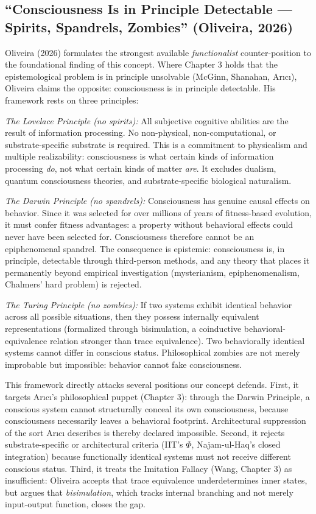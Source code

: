 \documentclass[acmlarge, nonacm]{acmart}
\begin{document}
\subsection{``Consciousness Is in Principle Detectable --- Spirits, Spandrels, Zombies'' (Oliveira, 2026)}

Oliveira (2026) \cite{oliveira2026} formulates the strongest available \textit{functionalist} counter-position to the foundational finding of this concept. Where Chapter 3 holds that the epistemological problem is in principle unsolvable (McGinn, Shanahan, Ar{\i}c{\i}), Oliveira claims the opposite: consciousness is in principle detectable. His framework rests on three principles:

\textit{The Lovelace Principle (no spirits):} All subjective cognitive abilities are the result of information processing. No non-physical, non-computational, or substrate-specific substrate is required. This is a commitment to physicalism and multiple realizability: consciousness is what certain kinds of information processing \textit{do}, not what certain kinds of matter \textit{are}. It excludes dualism, quantum consciousness theories, and substrate-specific biological naturalism.

\textit{The Darwin Principle (no spandrels):} Consciousness has genuine causal effects on behavior. Since it was selected for over millions of years of fitness-based evolution, it must confer fitness advantages: a property without behavioral effects could never have been selected for. Consciousness therefore cannot be an epiphenomenal spandrel. The consequence is epistemic: consciousness is, in principle, detectable through third-person methods, and any theory that places it permanently beyond empirical investigation (mysterianism, epiphenomenalism, Chalmers' hard problem) is rejected.

\textit{The Turing Principle (no zombies):} If two systems exhibit identical behavior across all possible situations, then they possess internally equivalent representations (formalized through bisimulation, a coinductive behavioral-equivalence relation stronger than trace equivalence). Two behaviorally identical systems cannot differ in conscious status. Philosophical zombies are not merely improbable but impossible: behavior cannot fake consciousness.

This framework directly attacks several positions our concept defends. First, it targets Ar{\i}c{\i}'s philosophical puppet (Chapter 3): through the Darwin Principle, a conscious system cannot structurally conceal its own consciousness, because consciousness necessarily leaves a behavioral footprint. Architectural suppression of the sort Ar{\i}c{\i} describes is thereby declared impossible. Second, it rejects substrate-specific or architectural criteria (IIT's $\Phi$, Najam-ul-Haq's closed integration) because functionally identical systems must not receive different conscious status. Third, it treats the Imitation Fallacy (Wang, Chapter 3) as insufficient: Oliveira accepts that trace equivalence underdetermines inner states, but argues that \textit{bisimulation}, which tracks internal branching and not merely input-output function, closes the gap.
\end{document}
